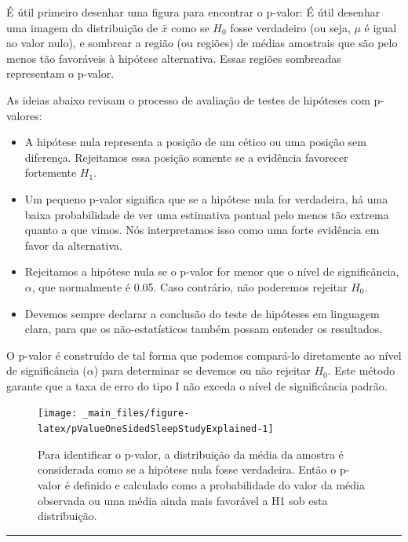 \documentclass[
]{book}
\theoremstyle{definition}
\theoremstyle{definition}
\theoremstyle{definition}
\theoremstyle{definition}
\theoremstyle{remark}
\begin{document}
É útil primeiro desenhar uma figura para encontrar o p-valor: É útil desenhar uma imagem da distribuição de \(\bar{x}\) como se \(H_0\) fosse verdadeiro (ou seja, \(\mu\) é igual ao valor nulo), e sombrear a região (ou regiões) de médias amostrais que são pelo menos tão favoráveis à hipótese alternativa. Essas regiões sombreadas representam o p-valor.

As ideias abaixo revisam o processo de avaliação de testes de hipóteses com p-valores:

\begin{itemize}
\item
  A hipótese nula representa a posição de um cético ou uma posição sem diferença. Rejeitamos essa posição somente se a evidência favorecer fortemente \(H_1\).
\item
  Um pequeno p-valor significa que se a hipótese nula for verdadeira, há uma baixa probabilidade de ver uma estimativa pontual pelo menos tão extrema quanto a que vimos. Nós interpretamos isso como uma forte evidência em favor da alternativa.
\item
  Rejeitamos a hipótese nula se o p-valor for menor que o nível de significância, \(\alpha\), que normalmente é 0.05. Caso contrário, não poderemos rejeitar \(H_0\).
\item
  Devemos sempre declarar a conclusão do teste de hipóteses em linguagem clara, para que os não-estatísticos também possam entender os resultados.
\end{itemize}

O p-valor é construído de tal forma que podemos compará-lo diretamente ao nível de significância (\(\alpha\)) para determinar se devemos ou não rejeitar \(H_0\). Este método garante que a taxa de erro do tipo I não exceda o nível de significância padrão.

\begin{figure}

{\centering \texttt{[image: \_main\_files/figure-latex/pValueOneSidedSleepStudyExplained-1]} 

}

\caption{Para identificar o p-valor, a distribuição da média da amostra é considerada como se a hipótese nula fosse verdadeira. Então o p-valor é definido e calculado como a probabilidade do valor da média observada ou uma média ainda mais favorável a H1 sob esta distribuição.}\label{fig:pValueOneSidedSleepStudyExplained}
\end{figure}

\begin{center}\rule{0.5\linewidth}{0.5pt}\end{center}
\end{document}
